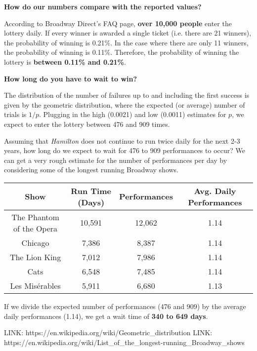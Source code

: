 \documentclass[12pt]{article}
\begin{document}
\vspace{5mm}

\textbf{How do our numbers compare with the reported values?}

According to Broadway Direct's FAQ page, \textbf{over 10,000 people} enter the lottery daily. If every winner is awarded a single ticket (i.e. there are 21 winners), the probability of winning is 0.21\%. In the case where there are only 11 winners, the probability of winning is 0.11\%. Therefore, the probability of winning the lottery is \textbf{between 0.11\% and 0.21\%}.

\vspace{5mm}

\textbf{How long do you have to wait to win?}

The distribution of the number of failures up to and including the first success is given by the geometric distribution, where the expected (or average) number of trials is $1/p$. Plugging in the high (0.0021) and low (0.0011) estimates for $p$, we expect to enter the lottery between 476 and 909 times.

Assuming that \textit{Hamilton} does not continue to run twice daily for the next 2-3 years, how long do we expect to wait for 476 to 909 performances to occur? We can get a very rough estimate for the number of performances per day by considering some of the longest running Broadway shows.

\begin{center}
  \begin{tabular}{ | c | c | c | c |}
    \hline
    Show & Run Time (Days) & Performances & Avg. Daily Performances \\ \hline
    The Phantom of the Opera & 10,591 & 12,062 & 1.14\\ \hline
    Chicago & 7,386 & 8,387 & 1.14\\ \hline
    The Lion King & 7,012 & 7,986 & 1.14\\ \hline
    Cats & 6,548 & 7,485 & 1.14\\ \hline
    Les Mis\'{e}rables & 5,911 & 6,680 & 1.13\\ 
    \hline
  \end{tabular}
\end{center}

If we divide the expected number of performances (476 and 909) by the average daily performances (1.14), we get a wait time of \textbf{340 to 649 days}.

LINK: https://en.wikipedia.org/wiki/Geometric\_distribution
LINK: https://en.wikipedia.org/wiki/List\_of\_the\_longest-running\_Broadway\_shows
\end{document}
